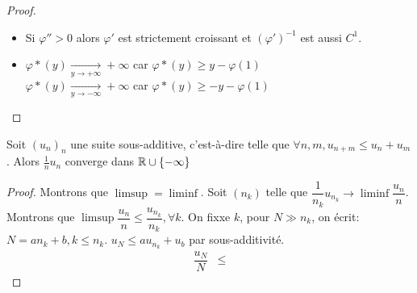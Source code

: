 \documentclass[]{report}
\begin{document}
\begin{proof}
\begin{enumerate}
\begin{itemize}
                Pour $y=0,\varphi*(0)=-\inf \varphi$ qui est atteint.\\
                Pour $y\neq 0$, tel que $\varphi*(y)<+\infty$, les $x_n$ doient rester dans un compact, on trouve $x$ tel que $\varphi*(y)=xy-\varphi(x)$ comme valeur d'adhérence des $x_n$.
                \item Si $\varphi''>0$ alors $\varphi'$ est strictement croissant et $(\varphi')^{-1}$ est aussi $C^1$.
                \item $\varphi*(y)\underset{y\to +\infty}{\longrightarrow}+\infty$ car $\varphi*(y)\ge y-\varphi(1)$\\
                $\varphi*(y)\underset{y\to -\infty}{\longrightarrow}+\infty$ car $\varphi*(y)\ge -y-\varphi(1)$
            \end{itemize}
        \end{enumerate}
    \end{proof}

    \begin{prop}{}{}
        Soit $(u_n)_n$ une suite sous-additive, c'est-à-dire telle que $\forall n,m, u_{n+m}\le u_n+u_m$. Alors $\frac{1}{n} u_n$ converge dans $\mathbb{R}\cup \{-\infty\}$
    \end{prop}

    \begin{proof}
        Montrons que $\limsup=\liminf$. Soit $(n_k)$ telle que $\dfrac{1}{n_k}u_{n_k}\to \liminf \dfrac{u_n}{n}$. Montrons que $\limsup \dfrac{u_n}{n}\le \dfrac{u_{n_k}}{n_k},\forall k$. On fixxe $k$, pour $N\gg n_k$, on écrit: $N=a n_k+b,k\le n_k$. $u_N\le a u_{n_k} +u_b$ par sous-additivité.
        \begin{align*}
            \dfrac{u_N}{N}&\le
        \end{align*}
    \end{proof}
\end{document}
